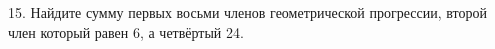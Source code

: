 15. Найдите сумму первых восьми членов геометрической прогрессии, второй член который равен 6, а четвёртый 24.\\
